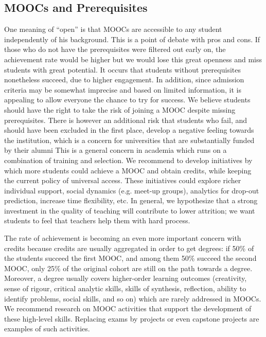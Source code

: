 \subsection{MOOCs and Prerequisites}

One meaning of  
``open''  is that MOOCs are accessible to any
student independently of his background. This is a point of debate with
pros and cons. If those who do not have the prerequisites were filtered
out early on, the achievement rate would be higher but we would lose
this great openness and miss students with great potential. It occurs
that students without prerequisites nonetheless succeed, due to higher
engagement. In addition, since admission criteria may be somewhat
imprecise and based on limited information, it is appealing to allow
everyone the chance to try for success. We believe students should have
the right to take the risk of joining a MOOC despite missing
prerequisites. There is however an additional risk that students who
fail, and should have been excluded in the first place, develop a
negative feeling towards the institution, which is a concern for
universities that are substantially funded by their alumni 
 This is a
general concern in academia which runs on a combination of training and
selection.  We recommend to develop initiatives by which more students
could achieve a MOOC and obtain credits, while keeping the current
policy of universal access. These initiatives could explore richer
individual support, social dynamics (e.g. meet-up groups), analytics for
drop-out prediction, increase time flexibility, etc. In general, we
hypothesize that a strong investment in the quality of teaching will
contribute to lower attrition; we want students to feel that teachers
help them with hard process.

The rate of achievement is becoming an even more important concern with
credits because credits are usually aggregated in order to get degrees:
if 50\% of the students succeed the first MOOC, and among them 50\%
succeed the second MOOC, only 25\% of the original cohort are still on
the path towards a degree. Moreover, a degree usually covers
higher-order learning outcomes (creativity, sense of rigour, critical
analytic skills, skills of synthesis, reflection, ability to identify
problems, social skills, and so on) which are rarely addressed in MOOCs. We
recommend research on MOOC activities that support the development of
these high-level skills. Replacing exams by projects or even capstone
projects are examples of such activities.

